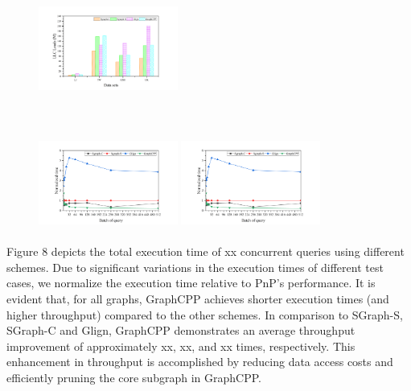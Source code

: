 \documentclass[lettersize,journal]{IEEEtran} %
\begin{document}
\begin{figure}[htbp]
\begin{minipage}[t]{0.50\linewidth}
		\includegraphics[width=1.8in, height=1.2in]{figure_11.png}
		\setlength{\abovecaptionskip}{-0.55cm} 
    \captionsetup{labelsep=period}
		\caption{}
		\label{fig11}
	\end{minipage}%
	\\
	\begin{minipage}[t]{0.50\linewidth} %
		\centering
		\includegraphics[width=1.8in, height=1.2in]{figure_12.png} %
		\setlength{\abovecaptionskip}{-0.55cm} 
    \captionsetup{labelsep=period}
		\caption{} %
		\label{fig12} %
	\end{minipage}%
	\begin{minipage}[t]{0.50\linewidth}
		\centering
		\includegraphics[width=1.8in, height=1.2in]{figure_12.png}
		\setlength{\abovecaptionskip}{-0.55cm} 
    \captionsetup{labelsep=period}
		\caption{}
		\label{fig13}
	\end{minipage}%
\end{figure}

Figure 8 depicts the total execution time of xx concurrent queries using different schemes. Due to significant variations in the execution times of different test cases, we normalize the execution time relative to PnP's performance. It is evident that, for all graphs, GraphCPP achieves shorter execution times (and higher throughput) compared to the other schemes. In comparison to SGraph-S, SGraph-C and Glign, GraphCPP demonstrates an average throughput improvement of approximately xx, xx, and xx times, respectively. This enhancement in throughput is accomplished by reducing data access costs and efficiently pruning the core subgraph in GraphCPP.
\end{document}
